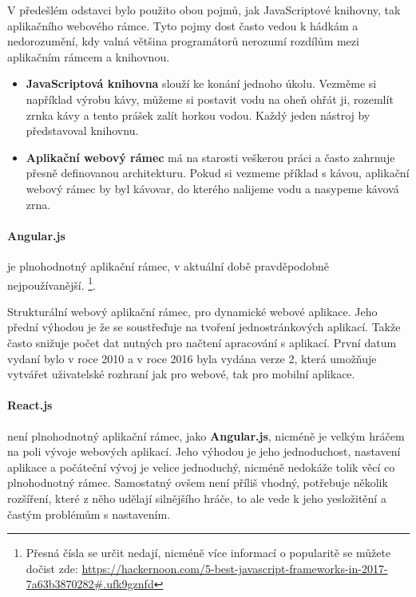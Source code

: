 \par V předešlém odstavci bylo použito obou pojmů, jak JavaScriptové knihovny, tak aplikačního webového rámce. Tyto pojmy dost často vedou k hádkám a nedorozumění, kdy valná většina programátorů nerozumí rozdílům mezi aplikačním rámcem a knihovnou.
\begin{itemize}
  \item \textbf{JavaScriptová knihovna} slouží ke konání jednoho úkolu. Vezměme si například výrobu kávy, můžeme si postavit vodu na oheň ohřát ji, rozemlít zrnka kávy a tento prášek zalít horkou vodou. Každý jeden nástroj by představoval knihovnu.
  \item \textbf{Aplikační webový rámec} má na starosti veškerou práci a často zahrnuje přesně definovanou architekturu. Pokud si vezmeme příklad s kávou, aplikační webový rámec by byl kávovar, do kterého nalijeme vodu a nasypeme kávová zrna. \cite{framework-vs-library}
\end{itemize}

\paragraph{Angular.js} je plnohodnotný aplikační rámec, v aktuální době pravděpodobně nejpoužívanější. \footnote{Přesná čísla se určit nedají, nicméně více informací o popularitě se můžete dočist zde: \url{https://hackernoon.com/5-best-javascript-frameworks-in-2017-7a63b3870282\#.ufk9gznfd}}.

\par Strukturální webový aplikační rámec, pro dynamické webové aplikace. Jeho přední výhodou je že se soustřeďuje na tvoření jednostránkových aplikací. Takže často snižuje počet dat nutných pro načtení apracování s aplikací. První datum vydaní bylo v roce 2010 a v roce 2016 byla vydána verze 2, která umožňuje vytvářet uživatelské rozhraní jak pro webové, tak pro mobilní aplikace.\cite{angular-js}

\paragraph{React.js} není plnohodnotný aplikační rámec, jako \textbf{Angular.js}, nicméně je velkým hráčem na poli vývoje webových aplikací. Jeho výhodou je jeho jednoduchost, nastavení aplikace a počáteční vývoj je velice jednoduchý, nicméně nedokáže tolik věcí co plnohodnotný rámec. Samostatný ovšem není příliš vhodný, potřebuje několik rozšíření, které z něho udělají silnějšího hráče, to ale vede k jeho yesložitění a častým problémům s nastavením. \cite{react-js}

